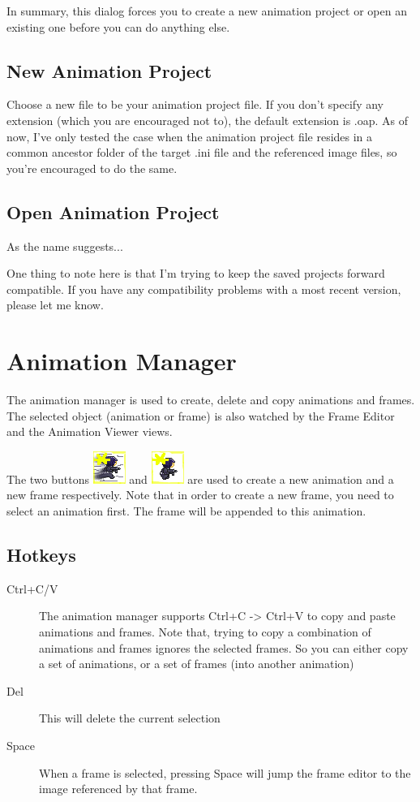 \documentclass{article}
\begin{document}
In summary, this dialog forces you to create a new animation project or open an existing one before you can do anything else.

\subsection{New Animation Project}
Choose a new file to be your animation project file. If you don't specify any extension (which you are encouraged not to), the default extension is .oap. As of now, I've
only tested the case when the animation project file resides in a common ancestor folder of the target .ini file and the referenced image files, so you're encouraged to
do the same.

\subsection{Open Animation Project}
As the name suggests... 

One thing to note here is that I'm trying to keep the saved projects forward compatible. If you have any compatibility problems with a most recent version, please let me know.

\section{Animation Manager}
The animation manager is used to create, delete and copy animations and frames. The selected object (animation or frame) is also watched by the Frame Editor and the
Animation Viewer views.

The two buttons \includegraphics{icons/NewAnimation} and \includegraphics{icons/NewFrame} are used to create a new animation and a new frame respectively. Note that
in order to create a new frame, you need to select an animation first. The frame will be appended to this animation.

\subsection{Hotkeys}
\begin{description}
\item[Ctrl+C/V] The animation manager supports Ctrl+C -> Ctrl+V to copy and paste animations and frames. Note that, trying to copy a combination of animations and frames ignores the selected frames. So you can either copy a set of animations, or a set of frames (into another animation)
\item[Del]   This will delete the current selection
\item[Space] When a frame is selected, pressing Space will jump the frame editor to the image referenced by that frame.

\end{description}
\end{document}
